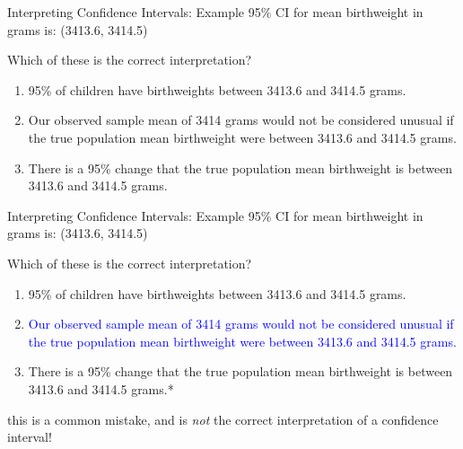 \documentclass[10pt,t]{beamer}
\begin{document}
\begin{frame}{Interpreting Confidence Intervals: Example}
95\% CI for mean birthweight in grams is: (3413.6, 3414.5)

\vspace{0.3cm}

Which of these is the correct interpretation?

\vspace{0.3cm}

\begin{enumerate}
	\item 95\% of children have birthweights between 3413.6 and 3414.5 grams.
	\item Our observed sample mean of 3414 grams would not be considered unusual if the true population mean birthweight were between 3413.6 and 3414.5 grams.
	\item There is a 95\% change that the true population mean birthweight is between 3413.6 and 3414.5 grams.
\end{enumerate}
\end{frame}

\begin{frame}{Interpreting Confidence Intervals: Example}
95\% CI for mean birthweight in grams is: (3413.6, 3414.5)

\vspace{0.3cm}

Which of these is the correct interpretation?

\vspace{0.3cm}

\begin{enumerate}
	\item 95\% of children have birthweights between 3413.6 and 3414.5 grams.
	\item \textcolor{blue}{Our observed sample mean of 3414 grams would not be considered unusual if the true population mean birthweight were between 3413.6 and 3414.5 grams.}
	\item There is a 95\% change that the true population mean birthweight is between 3413.6 and 3414.5 grams.*
\end{enumerate}

\small *this is a common mistake, and is \textit{not} the correct interpretation of a confidence interval!

\end{frame}
\end{document}
